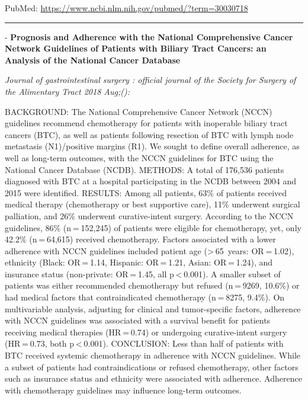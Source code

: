 \documentclass[]{article}
\begin{document}
PubMed: \url{https://www.ncbi.nlm.nih.gov/pubmed/?term=30030718}

{}

{}

\begin{center}\rule{0.5\linewidth}{\linethickness}\end{center}

 - \textbf{Prognosis and Adherence with the National Comprehensive
Cancer Network Guidelines of Patients with Biliary Tract Cancers: an
Analysis of the National Cancer Database}

\emph{Journal of gastrointestinal surgery : official journal of the
Society for Surgery of the Alimentary Tract 2018 Aug;():}

BACKGROUND: The National Comprehensive Cancer Network (NCCN) guidelines
recommend chemotherapy for patients with inoperable biliary tract
cancers (BTC), as well as patients following resection of BTC with lymph
node metastasis (N1)/positive margins (R1). We sought to define overall
adherence, as well as long-term outcomes, with the NCCN guidelines for
BTC using the National Cancer Database (NCDB). METHODS: A total of
176,536 patients diagnosed with BTC at a hospital participating in the
NCDB between 2004 and 2015 were identified. RESULTS: Among all patients,
63\% of patients received medical therapy (chemotherapy or best
supportive care), 11\% underwent surgical palliation, and 26\% underwent
curative-intent surgery. According to the NCCN guidelines, 86\%
(n = 152,245) of patients were eligible for chemotherapy, yet, only
42.2\% (n = 64,615) received chemotherapy. Factors associated with a
lower adherence with NCCN guidelines included patient age
(\textgreater{} 65~years: OR = 1.02), ethnicity (Black: OR = 1.14,
Hispanic: OR = 1.21, Asian: OR = 1.24), and insurance status
(non-private: OR = 1.45, all p \textless{} 0.001). A smaller subset of
patients was either recommended chemotherapy but refused (n = 9269,
10.6\%) or had medical factors that contraindicated chemotherapy
(n = 8275, 9.4\%). On multivariable analysis, adjusting for clinical and
tumor-specific factors, adherence with NCCN guidelines was associated
with a survival benefit for patients receiving medical therapies
(HR = 0.74) or undergoing curative-intent surgery (HR = 0.73, both
p \textless{} 0.001). CONCLUSION: Less than half of patients with BTC
received systemic chemotherapy in adherence with NCCN guidelines. While
a subset of patients had contraindications or refused chemotherapy,
other factors such as insurance status and ethnicity were associated
with adherence. Adherence with chemotherapy guidelines may influence
long-term outcomes.
\end{document}
